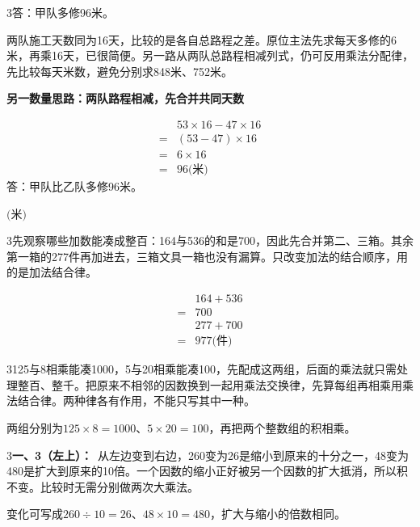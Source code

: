 \documentclass[multi=snippet,border={5bp 20bp 5bp 5bp}]{standalone}
\newenvironment{snippet}[3]{\begin{minipage}{#1bp}\color{answerred}\fontsize{#2}{#3}\selectfont\raggedright}{\end{minipage}}
\begin{document}
\begin{snippet}{505}{11.5}{14}\begin{multicols}{3}\raggedcolumns 答：甲队多修96米。\par 两队施工天数同为16天，比较的是各自总路程之差。原位主法先求每天多修的6米，再乘16天，已很简便。另一路从两队总路程相减列式，仍可反用乘法分配律，先比较每天米数，避免分别求848米、752米。\par \textbf{另一数量思路：两队路程相减，先合并共同天数}\par \[\begin{aligned}&53\times16-47\times16\\={}&(53-47)\times16\\={}&6\times16\\={}&96\text{(米)}\end{aligned}\]答：甲队比乙队多修96米。\end{multicols}\end{snippet}
\begin{snippet}{80}{10.0}{14}\SourceSans\setlength{\mathindent}{2bp}\(\text{(米)}\)\end{snippet}
\begin{snippet}{505}{11.5}{14}\begin{multicols}{3}\raggedcolumns 先观察哪些加数能凑成整百：164与536的和是700，因此先合并第二、三箱。其余第一箱的277件再加进去，三箱文具一箱也没有漏算。只改变加法的结合顺序，用的是加法结合律。\par \[\begin{aligned}&164+536\\={}&700\\&277+700\\={}&977\text{(件)}\end{aligned}\]\end{multicols}\end{snippet}
\begin{snippet}{505}{11.5}{14}\begin{multicols}{3}\raggedcolumns 125与8相乘能凑1000，5与20相乘能凑100，先配成这两组，后面的乘法就只需处理整百、整千。把原来不相邻的因数换到一起用乘法交换律，先算每组再相乘用乘法结合律。两种律各有作用，不能只写其中一种。\par 两组分别为\(125\times8=1000\)\allowbreak 、\(5\times20=100\)\allowbreak ，再把两个整数组的积相乘。\end{multicols}\end{snippet}
\begin{snippet}{505}{11.5}{14}\begin{multicols}{3}\raggedcolumns \textbf{一、3（左上）：}\ 从左边变到右边，260变为26是缩小到原来的十分之一，48变为480是扩大到原来的10倍。一个因数的缩小正好被另一个因数的扩大抵消，所以积不变。比较时无需分别做两次大乘法。\par 变化可写成\(260\div10=26\)\allowbreak 、\(48\times10=480\)\allowbreak ，扩大与缩小的倍数相同。\end{multicols}\end{snippet}
\end{document}
